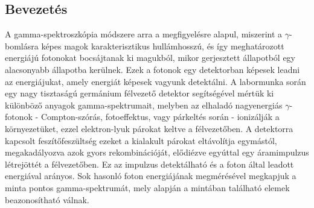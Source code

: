 \begin{multicols}{2}
\section{Bevezetés}
A gamma-spektroszkópia módszere arra a megfigyelésre alapul, miszerint a $\gamma$-bomlásra képes magok karakterisztikus hullámhosszú, és így meghatározott energiájú fotonokat bocsájtanak ki magukból, mikor gerjesztett állapotból egy alacsonyabb állapotba kerülnek. Ezek a fotonok egy detektorban képesek leadni az energiájukat, amely energiát képesek vagyunk detektálni. \newline
A labormunka során egy nagy tisztaságú germánium félvezető detektor segítségével mértük ki különböző anyagok gamma-spektrumait, melyben az elhaladó nagyenergiás $\gamma$-fotonok - Compton-szórás, fotoeffektus, vagy párkeltés során - ionizálják a környezetüket, ezzel elektron-lyuk párokat keltve a félvezetőben. A detektorra kapcsolt feszítőfeszültség ezeket a kialakult párokat eltávolítja egymástól, megakadályozva azok gyors rekombinációját, elődiézve egyúttal egy áramimpulzus létrejöttét a félvezetőben. Ez az impulzus detektálható és a foton által leadott energiával arányos. Sok hasonló foton energiájának megmérésével megkapjuk a minta pontos gamma-spektrumát, mely alapján a mintában található elemek beazonosítható válnak.



\end{multicols}
